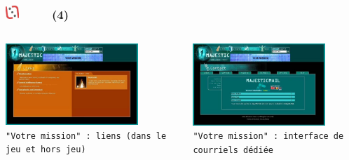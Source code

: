 \documentclass[slidetop,11pt]{beamer}
\def\moreInFrameTitleLeftt{\includegraphics[height=0.5cm]{img/ligueludique-0.png}~~~~~}
\begin{document}
\begin{frame}
	\frametitle{\moreInFrameTitleLeftt \sectionPartIIaV  (4) }
	\begin{columns}[T]
		\begin{column}[T]{5.05cm}
			\includegraphics[width=5.00cm]{img/majesticARGgame/majestic-screenshot-ME0000046991_2.jpg}~\\
			\texttt{\footnotesize "Votre mission" : liens (dans le jeu et hors jeu) }
		\end{column}
		\begin{column}[T]{5.05cm}
			\includegraphics[width=5.00cm]{img/majesticARGgame/majestic-screenshot-ME0000046992_2.jpg}~\\
			\texttt{\footnotesize "Votre mission" : interface de courriels d{\'e}di{\'e}e }
		\end{column}
	\end{columns}
\end{frame}
\end{document}
